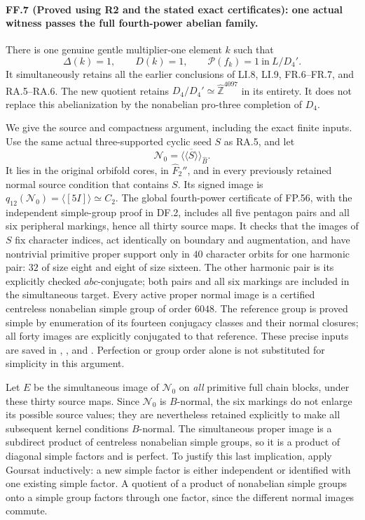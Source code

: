 \paragraph{FF.7 (Proved using R2 and the stated exact certificates): one actual witness passes the full fourth-power abelian family.}
There is one genuine gentle multiplier-one element $k$ such
that
\[
 \boxed{\quad \Delta(k)=1,\qquad D(k)=1,\qquad
       \mathcal P(f_k)=1\ \text{in}\ L/D_4'.\quad}
 \tag{FF.7a}
\]
It simultaneously retains all the earlier conclusions of
LI.8, LI.9, FR.6--FR.7, and RA.5--RA.6. The new quotient
retains $D_4/D_4'\simeq\widehat{\mathbb Z}^{4097}$ in its
entirety. It does not replace this abelianization by the
nonabelian pro-three completion of $D_4$.

We give the source and compactness argument, including the
exact finite inputs. Use the same actual three-supported
cyclic seed $S$ as RA.5, and let
\[
         \mathcal N_0=\overline{\langle\!\langle S
                              \rangle\!\rangle}_{\widehat B}.
\]
It lies in the original orbifold cores, in $\widehat F_2''$,
and in every previously retained normal source condition
that contains $S$. Its signed image is
$q_{12}(\mathcal N_0)=\langle[5I]\rangle\simeq C_2$.
The global fourth-power certificate of FP.56, with the
independent simple-group proof in DF.2, includes all five
pentagon pairs and all six peripheral markings, hence all
thirty source maps. It checks that the images of $S$ fix
character indices, act identically on boundary and
augmentation, and have nontrivial primitive proper support
only in $40$ character orbits for one harmonic pair: $32$
of size eight and eight of size sixteen. The other harmonic
pair is its explicitly checked $abc$-conjugate; both pairs
and all six markings are included in the simultaneous target.
Every active proper normal image
is a certified centreless nonabelian simple group of order
$6048$. The reference group is proved simple by enumeration
of its fourteen conjugacy classes and their normal closures;
all forty images are explicitly conjugated to that reference.
These precise inputs are saved in
,
, and
.
Perfection or group order alone is not substituted for
simplicity in this argument.

Let $E$ be the simultaneous image of $\mathcal N_0$ on
\emph{all} primitive full chain blocks, under these thirty
source maps. Since $\mathcal N_0$ is $B$-normal, the six
markings do not enlarge its possible source values; they
are nevertheless retained explicitly to make all subsequent
kernel conditions $B$-normal. The simultaneous proper image
is a subdirect product of centreless nonabelian simple groups,
so it is a product of diagonal simple factors and is perfect.
To justify this last implication, apply Goursat inductively:
a new simple factor is either independent or identified with
one existing simple factor. A quotient of a product of
nonabelian simple groups onto a simple group factors through
one factor, since the different normal images commute.

